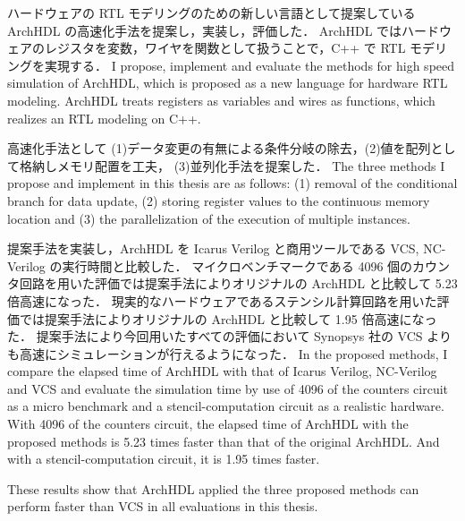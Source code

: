 ハードウェアの RTL モデリングのための新しい言語として提案している ArchHDL の高速化手法を提案し，実装し，評価した．
ArchHDL ではハードウェアのレジスタを変数，ワイヤを関数として扱うことで，C++ で RTL モデリングを実現する．
\fi
I propose, implement and evaluate the methods for high speed simulation of ArchHDL, which is proposed as a new language for hardware RTL modeling.
ArchHDL treats registers as variables and wires as functions, which realizes an RTL modeling on C++.

高速化手法として (1)データ変更の有無による条件分岐の除去，(2)値を配列として格納しメモリ配置を工夫，
(3)並列化手法を提案した．
\fi
The three methods I propose and implement in this thesis are as follows:
(1) removal of the conditional branch for data update,
(2) storing register values to the continuous memory location
and (3) the parallelization of the execution of multiple instances.

提案手法を実装し，ArchHDL を Icarus Verilog と商用ツールである VCS, NC-Verilog の実行時間と比較した．
マイクロベンチマークである 4096 個のカウンタ回路を用いた評価では提案手法によりオリジナルの ArchHDL と比較して 5.23 倍高速になった．
現実的なハードウェアであるステンシル計算回路を用いた評価では提案手法によりオリジナルの ArchHDL と比較して 1.95 倍高速になった．
提案手法により今回用いたすべての評価において Synopsys 社の VCS よりも高速にシミュレーションが行えるようになった．
\fi
In the proposed methods,
I compare the elapsed time of ArchHDL with that of Icarus Verilog, NC-Verilog and VCS
and evaluate the simulation time by use of 4096 of the counters circuit as a micro benchmark and a stencil-computation circuit as a realistic hardware.
With 4096 of the counters circuit, the elapsed time of ArchHDL with the proposed methods is 5.23 times faster than that of the original ArchHDL.
And with a stencil-computation circuit, it is 1.95 times faster.

These results show that ArchHDL applied the three proposed methods can perform faster than VCS in all evaluations in this thesis.
